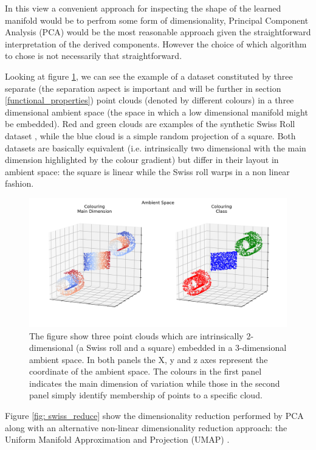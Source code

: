 In this view a convenient approach for inspecting the shape of the learned manifold would be to perfrom some form of dimensionality, Principal Component Analysis (PCA) \cite{pearson1901liii} would be the most reasonable approach given the straightforward interpretation of the derived components. However the choice of which algorithm to chose is not necessarily that straightforward. 

Looking at figure \ref{fig: swiss_ambient}, we can see the example of a dataset constituted by three separate (the separation aspect is important and will be further in section \ref{functional_properties}) point clouds (denoted by different colours) in a three dimensional ambient space (the space in which a low dimensional manifold might be embedded). Red and green clouds are examples of the synthetic Swiss Roll dataset \cite{scikit-learn}, while the blue cloud is a simple random projection of a square. Both datasets are basically equivalent (i.e. intrinsically two dimensional with the main dimension highlighted by the colour gradient) but differ in their layout in ambient space: the square is linear while the Swiss roll warps in a non linear fashion.

\begin{figure}[!htb]
  \centering
  \includegraphics[width=\textwidth]{images/chapter_4/ambient.png}
    \caption[\textbf{Swiss rolls and square in ambient space}]{The figure show three point clouds which are intrinsically 2-dimensional (a Swiss roll and a square) embedded in a 3-dimensional ambient space. In both panels the X, y and z axes represent the coordinate of the ambient space. The colours in the first panel indicates the main dimension of variation while those in the second panel simply identify membership of points to a specific cloud.}
    \label{fig: swiss_ambient}
\end{figure}

Figure \ref{fig: swiss_reduce} show the dimensionality reduction performed by PCA along with an alternative non-linear dimensionality reduction approach: the Uniform Manifold Approximation and Projection (UMAP) \cite{2018arXivUMAP}. 

